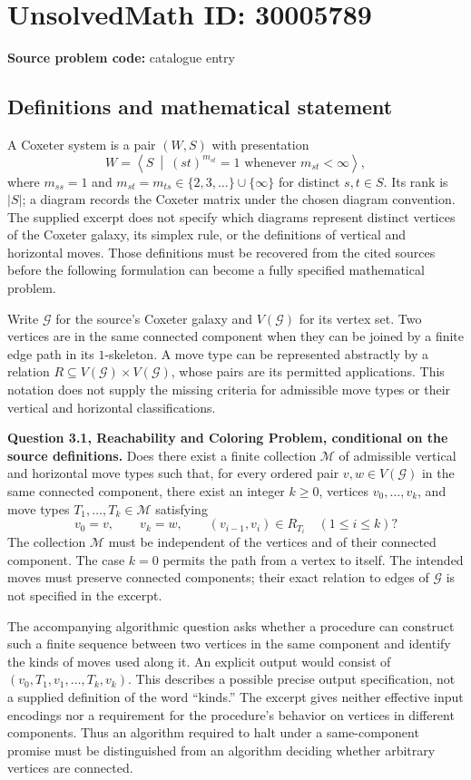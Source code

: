\documentclass[11pt]{article}
\begin{document}
\section*{UnsolvedMath ID: 30005789}
\textbf{Source problem code:} catalogue entry
\subsection{Definitions and mathematical statement}
A Coxeter system is a pair \((W,S)\) with presentation
\[
W=\left\langle S\ \middle|\ (st)^{m_{st}}=1\text{ whenever }m_{st}<\infty\right\rangle,
\]
where \(m_{ss}=1\) and \(m_{st}=m_{ts}\in\{2,3,\ldots\}\cup\{\infty\}\) for distinct \(s,t\in S\). Its rank is \(|S|\); a diagram records the Coxeter matrix under the chosen diagram convention. The supplied excerpt does not specify which diagrams represent distinct vertices of the Coxeter galaxy, its simplex rule, or the definitions of vertical and horizontal moves. Those definitions must be recovered from the cited sources before the following formulation can become a fully specified mathematical problem.

Write \(\mathcal G\) for the source's Coxeter galaxy and \(V(\mathcal G)\) for its vertex set. Two vertices are in the same connected component when they can be joined by a finite edge path in its \(1\)-skeleton. A move type can be represented abstractly by a relation \(R\subseteq V(\mathcal G)\times V(\mathcal G)\), whose pairs are its permitted applications. This notation does not supply the missing criteria for admissible move types or their vertical and horizontal classifications.

\textbf{Question 3.1, Reachability and Coloring Problem, conditional on the source definitions.} Does there exist a finite collection \(\mathscr M\) of admissible vertical and horizontal move types such that, for every ordered pair \(v,w\in V(\mathcal G)\) in the same connected component, there exist an integer \(k\geq0\), vertices \(v_0,\ldots,v_k\), and move types \(T_1,\ldots,T_k\in\mathscr M\) satisfying
\[
v_0=v,\qquad v_k=w,\qquad
(v_{i-1},v_i)\in R_{T_i}\quad(1\leq i\leq k)?
\]
The collection \(\mathscr M\) must be independent of the vertices and of their connected component. The case \(k=0\) permits the path from a vertex to itself. The intended moves must preserve connected components; their exact relation to edges of \(\mathcal G\) is not specified in the excerpt.

The accompanying algorithmic question asks whether a procedure can construct such a finite sequence between two vertices in the same component and identify the kinds of moves used along it. An explicit output would consist of \((v_0,T_1,v_1,\ldots,T_k,v_k)\). This describes a possible precise output specification, not a supplied definition of the word ``kinds.'' The excerpt gives neither effective input encodings nor a requirement for the procedure's behavior on vertices in different components. Thus an algorithm required to halt under a same-component promise must be distinguished from an algorithm deciding whether arbitrary vertices are connected.
\end{document}
